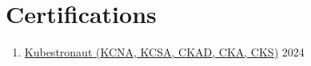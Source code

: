 \documentclass[11pt]{article}
\newcommand{\linkicon}{
  \color{gray}{\footnotesize\raisebox{1pt}{\faIcon{external-link-alt}}}
}
\newcommand{\aux}[1]{
  $|$ \space {\normalfont\itshape #1}%
}
\newcommand{\rside}[1]{
  \hfill {\normalfont\color{gray} #1}%
}
\begin{document}
\section{Certifications}
\begin{enumerate}[label=\null, left=0pt..0pt, itemsep=0pt]
  \item \href{https://www.credly.com/badges/8d805ba8-9e7d-44d8-ae24-e053f07b86c3/public_url}{Kubestronaut (KCNA, KCSA, CKAD, CKA, CKS)} \rside{2024}
\end{enumerate}






\end{document}
